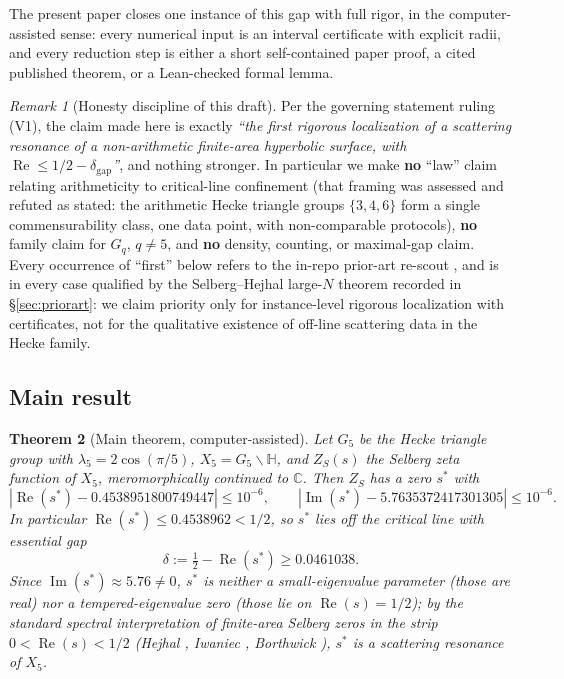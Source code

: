 \documentclass[11pt]{article}
\newtheorem{theorem}{Theorem}
\theoremstyle{definition}
\theoremstyle{remark}
\newtheorem{remark}[theorem]{Remark}
\newcommand{\HH}{\mathbb{H}}
\newcommand{\CC}{\mathbb{C}}
\renewcommand{\Re}{\operatorname{Re}}
\renewcommand{\Im}{\operatorname{Im}}
\begin{document}
The present paper closes one instance of this gap with full rigor, in
the computer-assisted sense: every numerical input is an interval
certificate with explicit radii, and every reduction step is either a
short self-contained paper proof, a cited published theorem, or a
Lean-checked formal lemma.

\begin{remark}[Honesty discipline of this draft]
Per the governing statement ruling (V1), the claim made here is exactly
\emph{``the first rigorous localization of a scattering resonance of a
non-arithmetic finite-area hyperbolic surface, with
$\Re \le 1/2 - \delta_{\mathrm{gap}}$''}, and nothing stronger. In
particular we make \textbf{no} ``law'' claim relating arithmeticity to
critical-line confinement (that framing was assessed and refuted as
stated: the arithmetic Hecke triangle groups $\{3,4,6\}$ form a single
commensurability class, one data point, with non-comparable protocols),
\textbf{no} family claim for $G_q$, $q \ne 5$, and \textbf{no} density,
counting, or maximal-gap claim. Every occurrence of ``first'' below
refers to the in-repo prior-art re-scout \cite{NoveltyRescout}, and is
in every case qualified by the Selberg--Hejhal large-$N$ theorem
recorded in \S\ref{sec:priorart}: we claim priority only for
instance-level rigorous localization with certificates, not for the
qualitative existence of off-line scattering data in the Hecke family.
\end{remark}

\subsection{Main result}

\begin{theorem}[Main theorem, computer-assisted]
\label{thm:main}
Let $G_5$ be the Hecke triangle group with
$\lambda_5 = 2\cos(\pi/5)$, $X_5 = G_5\backslash\HH$, and $Z_S(s)$ the
Selberg zeta function of $X_5$, meromorphically continued to $\CC$.
Then $Z_S$ has a zero $s^*$ with
\begin{equation}
\label{eq:box}
|\Re(s^*) - 0.4538951800749447| \le 10^{-6},
\qquad
|\Im(s^*) - 5.7635372417301305| \le 10^{-6}.
\end{equation}
In particular $\Re(s^*) \le 0.4538962 < 1/2$, so $s^*$ lies off the
critical line with essential gap
\begin{equation}
\label{eq:gap}
\delta := \tfrac12 - \Re(s^*) \ge 0.0461038.
\end{equation}
Since $\Im(s^*) \approx 5.76 \neq 0$, $s^*$ is neither a
small-eigenvalue parameter (those are real) nor a tempered-eigenvalue
zero (those lie on $\Re(s) = 1/2$); by the standard spectral
interpretation of finite-area Selberg zeros in the strip
$0 < \Re(s) < 1/2$ (Hejhal \cite{HejhalLNM1001}, Iwaniec
\cite{IwaniecGSM53}, Borthwick \cite{BorthwickBook}), $s^*$ is a
scattering \emph{resonance} of $X_5$.
\end{theorem}
\end{document}
